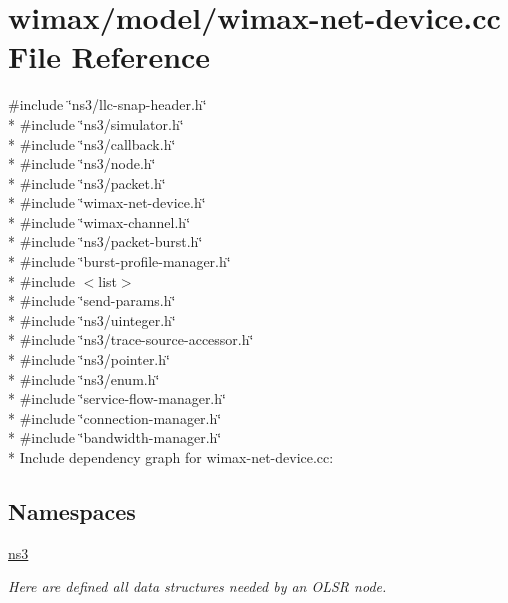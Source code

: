 \hypertarget{wimax-net-device_8cc}{}\section{wimax/model/wimax-\/net-\/device.cc File Reference}
\label{wimax-net-device_8cc}
{\ttfamily \#include \char`\"{}ns3/llc-\/snap-\/header.\+h\char`\"{}}\\*
{\ttfamily \#include \char`\"{}ns3/simulator.\+h\char`\"{}}\\*
{\ttfamily \#include \char`\"{}ns3/callback.\+h\char`\"{}}\\*
{\ttfamily \#include \char`\"{}ns3/node.\+h\char`\"{}}\\*
{\ttfamily \#include \char`\"{}ns3/packet.\+h\char`\"{}}\\*
{\ttfamily \#include \char`\"{}wimax-\/net-\/device.\+h\char`\"{}}\\*
{\ttfamily \#include \char`\"{}wimax-\/channel.\+h\char`\"{}}\\*
{\ttfamily \#include \char`\"{}ns3/packet-\/burst.\+h\char`\"{}}\\*
{\ttfamily \#include \char`\"{}burst-\/profile-\/manager.\+h\char`\"{}}\\*
{\ttfamily \#include $<$list$>$}\\*
{\ttfamily \#include \char`\"{}send-\/params.\+h\char`\"{}}\\*
{\ttfamily \#include \char`\"{}ns3/uinteger.\+h\char`\"{}}\\*
{\ttfamily \#include \char`\"{}ns3/trace-\/source-\/accessor.\+h\char`\"{}}\\*
{\ttfamily \#include \char`\"{}ns3/pointer.\+h\char`\"{}}\\*
{\ttfamily \#include \char`\"{}ns3/enum.\+h\char`\"{}}\\*
{\ttfamily \#include \char`\"{}service-\/flow-\/manager.\+h\char`\"{}}\\*
{\ttfamily \#include \char`\"{}connection-\/manager.\+h\char`\"{}}\\*
{\ttfamily \#include \char`\"{}bandwidth-\/manager.\+h\char`\"{}}\\*
Include dependency graph for wimax-\/net-\/device.cc\+:
\subsection*{Namespaces}
\begin{DoxyCompactItemize}
\item 
 \hyperlink{namespacens3}{ns3}
\begin{DoxyCompactList}\small\item\em Here are defined all data structures needed by an O\+L\+SR node. \end{DoxyCompactList}\end{DoxyCompactItemize}
